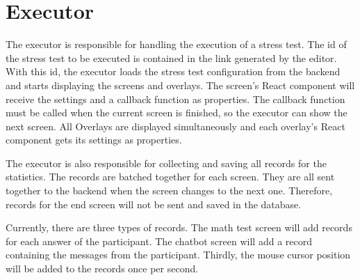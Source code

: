 \section{Executor}
\label{sec:executor}

The executor is responsible for handling the execution of a stress test.
The id of the stress test to be executed is contained in the link generated by the editor.
With this id, the executor loads the stress test configuration from the backend and starts displaying the screens and overlays.
The screen's React component will receive the settings and a callback function as properties. 
The callback function must be called when the current screen is finished, so the executor can show the next screen. 
All Overlays are displayed simultaneously and each overlay's React component gets its settings as properties.

The executor is also responsible for collecting and saving all records for the statistics.
The records are batched together for each screen.
They are all sent together to the backend when the screen changes to the next one.
Therefore, records for the end screen will not be sent and saved in the database.

Currently, there are three types of records.
The math test screen will add records for each answer of the participant.
The chatbot screen will add a record containing the messages from the participant.
Thirdly, the mouse cursor position will be added to the records once per second.
